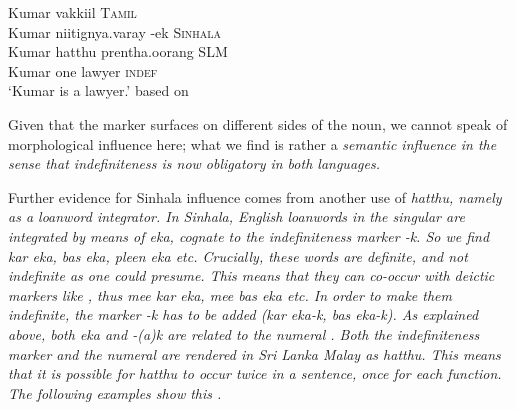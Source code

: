 \documentclass[a4paper,10pt]{article}
\begin{document}
\ea
\gllll Kumar { }   vakkiil         { } { } \textsc{Tamil} \\
       Kumar { }    niitignya.varay -ek { }  \textsc{Sinhala} \\
       Kumar hatthu prentha.oorang { } { } \textsc{SLM}  \\
       Kumar one    lawyer        \textsc{indef} \\
    `Kumar is a lawyer.' based on \citep[]{Lehmann1989tamil}
\z

Given that the marker surfaces on different sides of the noun, we cannot speak of morphological influence here; what we find is rather a \em semantic \em influence in the sense that indefiniteness is now obligatory in both languages.

Further evidence for Sinhala influence comes from another use of \em hatthu\em, namely as a loanword integrator. In Sinhala, English loanwords in the singular are integrated by means of \em eka\em, cognate to the indefiniteness marker \em -k. \em So we find \em kar eka, bas eka, pleen eka \em etc. Crucially, these words are \em definite\em, and not indefinite as one could presume. This means that they can co-occur with deictic markers like , thus \em mee kar eka, mee bas eka \em etc. In order to make them indefinite, the marker \em -k \em  has to be added (\em kar eka-k, bas eka-k\em). As explained above, both \em eka \em and \em -(a)k \em are related to the numeral . Both the indefiniteness marker and the numeral are rendered in Sri Lanka Malay as \em hatthu\em. This means that it is possible for \em hatthu \em to occur \em twice \em in a sentence, once for each function. The following examples show this \citep[cf.][]{Nordhoff2009phd}.


\end{document}
